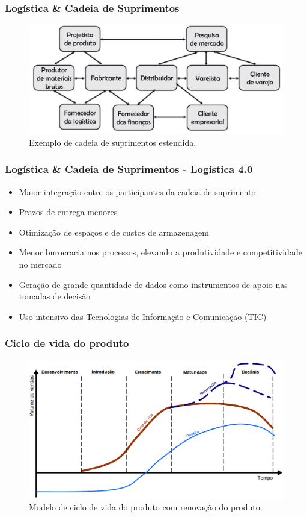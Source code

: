 \documentclass[10pt]{beamer}
\begin{document}
\begin{frame}
	\frametitle{Logística \& Cadeia de Suprimentos} 
	
	\begin{figure}[htb]
		\centering
		\caption{Exemplo de cadeia de suprimentos estendida.}
		\label{fig:cadeia-de-suprimentos}
		\includegraphics[width=1\textwidth]{cadeia-de-suprimentos.png}
	\end{figure}
	
\end{frame}
\begin{frame}
	\frametitle{Logística \& Cadeia de Suprimentos - Logística 4.0}
	
	\begin{itemize}
		\item Maior integração entre os participantes da cadeia de suprimento
		\item Prazos de entrega menores
		\item Otimização de espaços e de custos de armazenagem
		\item Menor burocracia nos processos, elevando a produtividade e competitividade no mercado
		\item Geração de grande quantidade de dados como instrumentos de apoio nas tomadas de decisão
		\item Uso intensivo das Tecnologias de Informação e Comunicação (TIC)
	\end{itemize}
	
\end{frame}
\begin{frame}
	\frametitle{Ciclo de vida do produto} 
	
	\begin{figure}[htb]
		\centering
		\caption{Modelo de ciclo de vida do produto com renovação do produto.}
		\label{fig:ciclo-de-vida-extensao}
		\includegraphics[width=1\textwidth]{ciclo-de-vida-extensao.png}
	\end{figure}
	
\end{frame}
\end{document}
